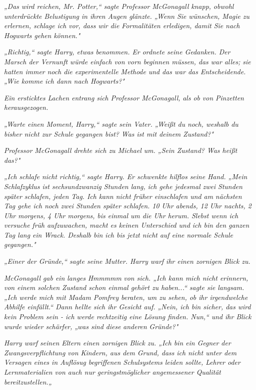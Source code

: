 {\emph{„Das wird reichen, Mr. Potter,“ sagte Professor McGonagall knapp, obwohl unterdrückte Belustigung in ihren Augen glänzte. „Wenn Sie wünschen, Magie zu erlernen, schlage ich vor, dass wir die Formalitäten erledigen, damit Sie nach Hogwarts gehen können."}

\emph{„Richtig,“ sagte Harry, etwas benommen. Er ordnete seine Gedanken. Der} \emph{Marsch der Vernunft würde einfach von vorn beginnen müssen, das war alles; sie hatten immer noch die experimentelle Methode und das war das Entscheidende. „Wie komme ich dann nach Hogwarts?"}

\emph{Ein ersticktes Lachen entrang sich Professor McGonagall,} \emph{als ob von Pinzetten herausgezogen.}

\emph{„Warte einen Moment, Harry,“ sagte sein Vater. „Weißt du noch, weshalb du bisher nicht zur Schule gegangen bist? Was ist mit deinem Zustand?"}

\emph{Professor McGonagall drehte sich zu Michael um. „Sein Zustand? Was heißt das?"}

\emph{„Ich schlafe nicht richtig,“ sagte Harry. Er schwenkte hilflos seine Hand. „Mein Schlafzyklus ist sechsundzwanzig Stunden lang, ich gehe jedesmal zwei Stunden später schlafen, jeden Tag. Ich kann nicht früher einschlafen und am nächsten Tag gehe ich noch zwei Stunden später schlafen. 10 Uhr abends, 12 Uhr nachts, 2 Uhr morgens, 4 Uhr morgens, bis einmal um die Uhr herum. Slebst wenn ich versuche früh aufzuwachen, macht es keinen Unterschied und ich bin den ganzen Tag lang ein Wrack. Deshalb bin ich bis jetzt nicht auf eine normale Schule gegangen."}

\emph{„Einer der Gründe,“ sagte seine Mutter. Harry warf ihr einen zornigen Blick zu.}

\emph{McGonagall gab ein langes} \emph{\emph{Hmmmmm}} \emph{von sich. „Ich kann mich nicht erinnern, von einem solchen Zustand schon einmal gehört zu haben...“ sagte sie langsam. „Ich werde mich mit Madam Pomfrey beraten, um zu sehen, ob ihr irgendwelche Abhilfe einfällt.“ Dann hellte sich ihr Gesicht auf. „Nein, ich bin sicher, das wird kein Problem sein - ich werde rechtzeitig eine Lösung finden. Nun,“ und ihr Blick wurde wieder schärfer, „was sind diese} \emph{\emph{anderen}} \emph{Gründe?"}

\emph{Harry warf seinen Eltern einen zornigen Blick zu. „Ich bin ein Gegner der Zwangsverpflichtung von Kindern, aus dem Grund, dass ich nicht unter dem Versagen eines in Auflösug begriffenen Schulsystems leiden sollte, Lehrer oder Lernmaterialien von auch nur geringstmöglicher angemessener Qualität bereitzustellen.„}

}
